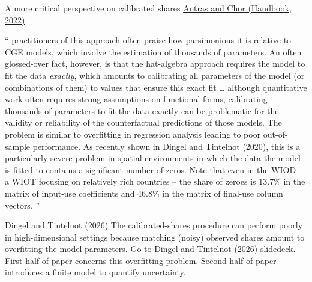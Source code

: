 \documentclass[11pt,notes=hide,aspectratio=169]{beamer}
\begin{document}
\begin{frame}{A more critical perspective on calibrated shares}
\href{https://doi.org/10.1016/bs.hesint.2022.02.005}{Antras and Chor (Handbook, 2022)}:\\
{\small
``
practitioners of this approach often praise how parsimonious it is relative to CGE models, which involve the estimation of thousands of parameters. An often glossed-over fact, however, is that the hat-algebra approach requires the model to fit the data \textit{exactly}, which amounts to calibrating all parameters of the model (or combinations of them) to values that ensure this exact fit
\dots
although quantitative work often requires strong assumptions on functional forms, calibrating thousands of parameters to fit the data exactly can be problematic for the validity or reliability of the counterfactual predictions of those models. The problem is similar to overfitting in regression analysis leading to poor out-of-sample performance. As recently shown in Dingel and Tintelnot (2020), this is a particularly severe problem in spatial environments in which the data the model is fitted to contains a significant number of zeros. Note that even in the WIOD -- a WIOT focusing on relatively rich countries -- the share of zeroes is 13.7\% in the matrix of input-use coefficients and 46.8\% in the matrix of final-use column vectors.%
''\par}
\end{frame}
\begin{frame}{Dingel and Tintelnot (2026)}
The calibrated-shares procedure can perform poorly in high-dimensional settings because matching (noisy) observed shares amount to overfitting the model parameters.
Go to Dingel and Tintelnot (2026) slidedeck.
First half of paper concerns this overfitting problem.
Second half of paper introduces a finite model to quantify uncertainty.
\end{frame}
\end{document}
